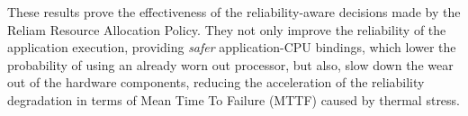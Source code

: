 These results prove the effectiveness of the reliability-aware decisions made by the Reliam Resource Allocation Policy. They not only improve the reliability of the application execution, providing \emph{safer} application-CPU bindings, which lower the probability of using an already worn out processor, but also, slow down the wear out of the hardware components, reducing the acceleration of the reliability degradation in terms of Mean Time To Failure (MTTF) caused by thermal stress.
